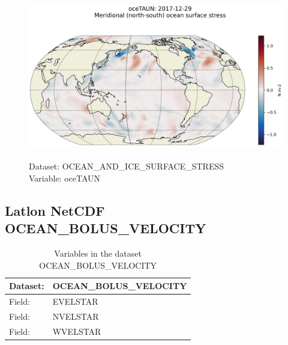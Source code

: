 \begin{figure}[H]
\centering
\includegraphics[scale=0.5]{../images/plots/latlon_plots/Ocean_and_Sea-Ice_Surface_Stress/oceTAUN.png}
\caption{\\Dataset: OCEAN\_AND\_ICE\_SURFACE\_STRESS\\Variable: oceTAUN}
\label{tab:table-OCEAN_AND_ICE_SURFACE_STRESS_oceTAUN-Plot}
\end{figure}
\pagebreak
\subsection{Latlon NetCDF OCEAN\_BOLUS\_VELOCITY}
\newp
\begin{longtable}{|p{}|p{}|}
\caption{Variables in the dataset OCEAN\_BOLUS\_VELOCITY}
\label{tab:table-OCEAN_BOLUS_VELOCITY-fields} \\ 
\hline \endhead \hline \endfoot
\rowcolor{lightgray} \textbf{Dataset:} & \textbf{OCEAN\_BOLUS\_VELOCITY} \\ \hline
Field: &EVELSTAR \\ \hline
Field: &NVELSTAR \\ \hline
Field: &WVELSTAR \\ \hline
\end{longtable}

\pagebreak
